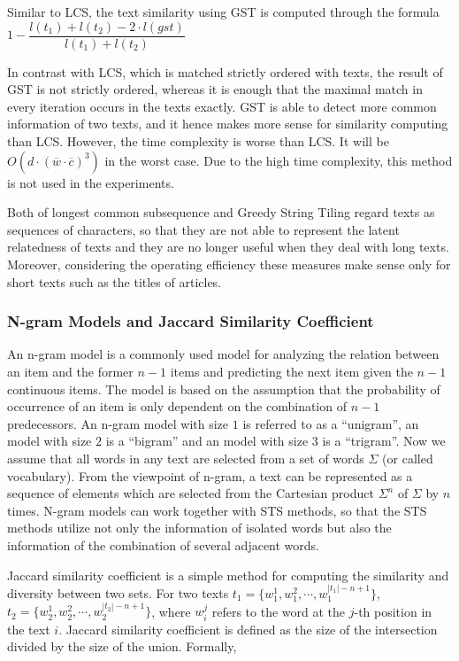 Similar to LCS, the text similarity using GST is computed through the formula $1-\dfrac{l(t_1) + l(t_2) - 2 \cdot l(gst)}{l(t_1) + l(t_2)}$

In contrast with LCS, which is matched strictly ordered with texts, the result of GST is not strictly ordered, whereas it is enough that the maximal match in every iteration occurs in the texts exactly. GST is able to detect more common information of two texts, and it hence makes more sense for similarity computing than LCS. However, the time complexity is worse than LCS. It will be  $O(d \cdot (\overline{w} \cdot \overline{c})^3)$ in the worst case. Due to the high time complexity, this method is not used in the experiments.

Both of longest common subsequence and Greedy String Tiling regard texts as sequences of characters, so that they are not able to represent the latent relatedness of texts and they are no longer useful when they deal with long texts. Moreover, considering the operating efficiency these measures make sense only for short texts such as the titles of articles. 


\subsubsection{N-gram Models and Jaccard Similarity Coefficient}

An n-gram model is a commonly used model for analyzing the relation between an item and the former $n-1$ items and predicting the next item given the $n-1$ continuous items. The model is based on the assumption that the probability of occurrence of an item is only dependent on the combination of $n-1$ predecessors. An n-gram model with size $1$ is referred to as a ``unigram'', an model with size $2$ is a ``bigram'' and an model with size $3$ is a ``trigram''. Now we assume that all words in any text are selected from a set of words $\Sigma$ (or called vocabulary). From the viewpoint of n-gram, a text can be represented as a sequence of elements which are selected from the Cartesian product $\Sigma ^n$ of $\Sigma$ by $n$ times. N-gram models can work together with STS methods, so that the STS methods utilize not only the information of isolated words but also the information of the combination of several adjacent words. 

Jaccard similarity coefficient \citep{bank2008calculating} is a simple method for computing the similarity and diversity between two sets. For two texts $t_1=\{w^1_1, w^2_1, \cdots, w^{|t_1|-n+1}_1\}$, $t_2=\{w^1_2, w^2_2, \cdots, w^{|t_2|-n+1}_2\}$, where $w_i^j$ refers to the word at the $j$-th position in the text $i$. Jaccard similarity coefficient is defined as the size of the intersection divided by the size of the union. Formally,

